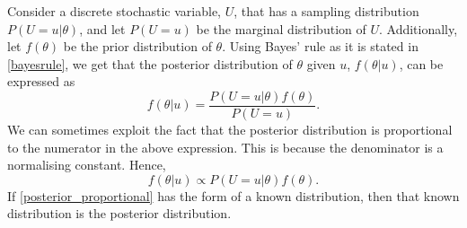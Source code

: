 Consider a discrete stochastic variable, $U$, that has a sampling distribution $P(U=u|\theta)$, and let $P(U=u)$ be the marginal distribution of $U$. Additionally, let $f(\theta)$ be the prior distribution of $\theta$. Using Bayes' rule as it is stated in \eqref{bayesrule}, we get that the posterior distribution of $\theta$ given $u$, $f(\theta|u)$, can be expressed as \citep{statinf}
\begin{equation*}
    f(\theta|u) = \frac{P(U=u|\theta)f(\theta)}{P(U=u)}.
\end{equation*}
We can sometimes exploit the fact that the posterior distribution is proportional to the numerator in the above expression. This is because the denominator is a normalising constant. Hence,
\begin{equation}
    \label{posterior_proportional}
    f(\theta|u) \propto P(U=u|\theta)f(\theta).
\end{equation}
If \eqref{posterior_proportional} has the form of a known distribution, then that known distribution is the posterior distribution. 

